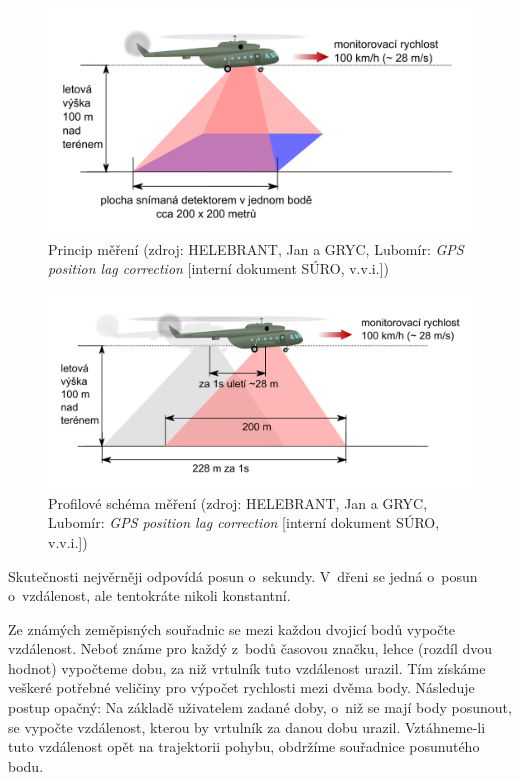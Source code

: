   \begin{figure}[H]
   \centering
	\includegraphics[scale=0.3]{./pictures/snimani.png}
	\caption[Princip měření]{Princip měření
	(zdroj: HELEBRANT, Jan a GRYC, Lubomír: \textit{GPS position lag correction} [interní dokument
	SÚRO, v.v.i.])}
      \label{fig:mereni}
  \end{figure}
  
  \begin{figure}[H]
   \centering
	\includegraphics[scale=0.25]{./pictures/snimani-detail.png}
	\caption[Profilové schéma měření]{Profilové schéma měření
	(zdroj: HELEBRANT, Jan a GRYC, Lubomír: \textit{GPS position lag correction} [interní dokument
	SÚRO, v.v.i.])}
      \label{fig:mereni-profil}
  \end{figure}
  
Skutečnosti nejvěrněji odpovídá posun o~sekundy. V~dřeni se jedná o~posun o~vzdálenost, ale tentokráte
nikoli konstantní. 

Ze známých zeměpisných souřadnic se mezi každou dvojicí bodů vypočte vzdále\-nost. Neboť známe pro každý
z~bodů časovou značku, lehce (rozdíl dvou hodnot) vypočteme dobu, za niž vrtulník tuto vzdálenost urazil.
Tím získáme veškeré potřebné veličiny pro výpočet rychlosti mezi dvěma body. Následuje postup opačný:
Na zá\-kladě uživatelem zadané doby, o~niž se mají body posunout, se vypočte vzdálenost, kterou by
vrtulník za danou dobu urazil. Vztáhneme-li tuto vzdálenost opět na trajektorii pohybu, obdržíme
souřadnice posunutého bodu. 

